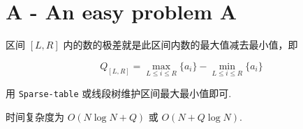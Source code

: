 \documentclass{ctexart}
\begin{document}
\section*{A - An easy problem A}

区间 $[L,R]$ 内的数的极差就是此区间内数的最大值减去最小值，即

\[
Q_{[L,R]} = \max_{L\le i \le R}{\{a_i\}} - \min_{L\le i \le R}{\{a_i\}}
\]

用 \verb|Sparse-table| 或线段树维护区间最大最小值即可.

时间复杂度为 $O(N\log{N}+Q)$ 或 $O(N+Q\log{N})$.
\end{document}
